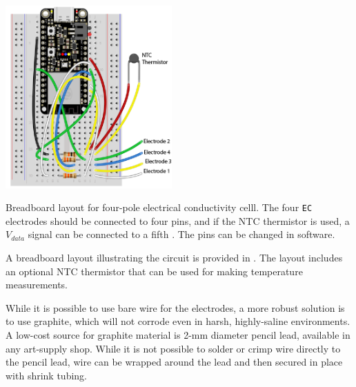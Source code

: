 \begin{marginfigure}[-3cm]
	\begin{center}
		\includegraphics[height=7cm]{Images/ec_breadboard.png}
		\caption[Breadboard layout for four-pole \texttt{EC} cell]{Breadboard layout for four-pole electrical conductivity celll. The four \texttt{EC} electrodes should be connected to four \adc pins, and if the NTC thermistor is used, a $V_{data}$ signal can be connected to a fifth \adc.  The \adc pins can be changed in software.}
	\end{center}
\end{marginfigure}

A breadboard layout illustrating the circuit is provided in . The layout includes an optional NTC thermistor that can be used for making temperature measurements.

While it is possible to use bare wire for the electrodes, a more robust solution is to use graphite, which will not corrode even in harsh, highly-saline environments. A low-cost source for graphite material is 2-mm diameter pencil lead, available in any art-supply shop. While it is not possible to solder or crimp wire directly to the pencil lead, wire can be wrapped around the lead and then secured in place with shrink tubing.


